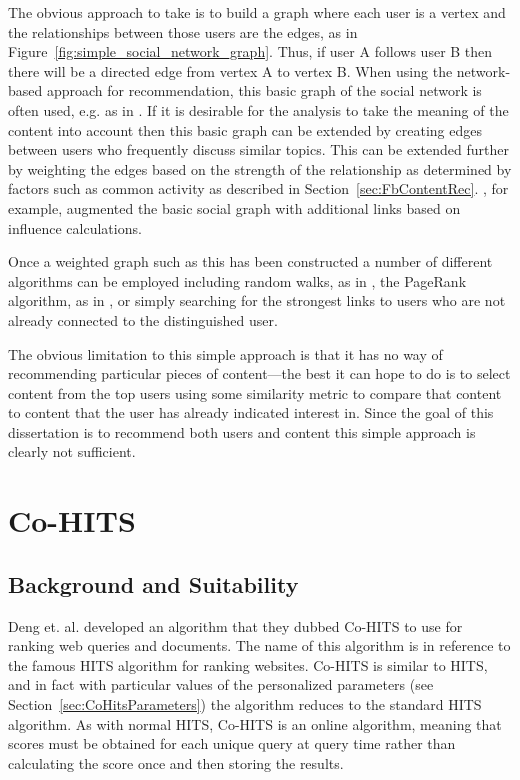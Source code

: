 The obvious approach to take is to build a graph where each user is a vertex and the relationships between those users are the edges, as in Figure~\ref{fig:simple_social_network_graph}. Thus, if user A follows user B then there will be a directed edge from vertex A to vertex B. When using the network-based approach for recommendation, this basic graph of the social network is often used, e.g. as in \cite{Hangal2010}. If it is desirable for the analysis to take the meaning of the content into account then this basic graph can be extended by creating edges between users who frequently discuss similar topics. This can be extended further by weighting the edges based on the strength of the relationship as determined by factors such as common activity as described in Section~\ref{sec:FbContentRec}. \cite{Hangal2010}, for example, augmented the basic social graph with additional links based on influence calculations.

Once a weighted graph such as this has been constructed a number of different algorithms can be employed including random walks, as in \cite{Backstrom2011}, the PageRank algorithm, as in \cite{Weng2010}, or simply searching for the strongest links to users who are not already connected to the distinguished user.

The obvious limitation to this simple approach is that it has no way of recommending particular pieces of content---the best it can hope to do is to select content from the top users using some similarity metric to compare that content to content that the user has already indicated interest in. Since the goal of this dissertation is to recommend both users and content this simple approach is clearly not sufficient.

\section{Co-HITS}

\subsection{Background and Suitability}
\label{sec:CoHitsBackground}

Deng et. al. \cite{Deng2009} developed an algorithm that they dubbed Co-HITS to use for ranking web queries and documents. The name of this algorithm is in reference to the famous HITS algorithm \cite{Kleinberg1999} for ranking websites. Co-HITS is similar to HITS, and in fact with particular values of the personalized parameters (see Section~\ref{sec:CoHitsParameters}) the algorithm reduces to the standard HITS algorithm. As with normal HITS, Co-HITS is an online algorithm, meaning that scores must be obtained for each unique query at query time rather than calculating the score once and then storing the results.

